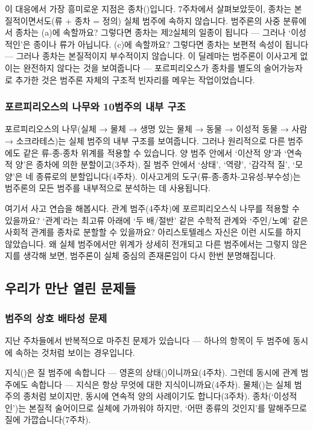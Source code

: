 \documentclass[12pt, a4paper]{article}
\begin{document}
이 대응에서 가장 흥미로운 지점은 종차()입니다. 7주차에서 살펴보았듯이, 종차는 본질적이면서도(류 + 종차 = 정의) 실체 범주에 속하지 않습니다. 범주론의 사중 분류에서 종차는 (a)에 속할까요? 그렇다면 종차는 제2실체의 일종이 됩니다 --- 그러나 `이성적인'은 종이나 류가 아닙니다. (c)에 속할까요? 그렇다면 종차는 보편적 속성이 됩니다 --- 그러나 종차는 본질적이지 부수적이지 않습니다. 이 딜레마는 범주론이 이사고게 없이는 완전하지 않다는 것을 보여줍니다 --- 포르피리오스가 종차를 별도의 술어가능자로 추가한 것은 범주론 자체의 구조적 빈자리를 메우는 작업이었습니다.

\subsubsection{포르피리오스의 나무와 10범주의 내부 구조}

포르피리오스의 나무(실체 → 물체 → 생명 있는 물체 → 동물 → 이성적 동물 → 사람 → 소크라테스)는 실체 범주의 내부 구조를 보여줍니다. 그러나 원리적으로 다른 범주에도 같은 류-종-종차 위계를 적용할 수 있습니다. 양 범주 안에서 `이산적 양'과 `연속적 양'은 종차에 의한 분할이고(3주차), 질 범주 안에서 `상태', `역량', `감각적 질', `모양'은 네 종류로의 분할입니다(4주차). 이사고게의 도구(류-종-종차-고유성-부수성)는 범주론의 모든 범주를 내부적으로 분석하는 데 사용됩니다.

여기서 사고 연습을 해봅시다. 관계 범주(4주차)에 포르피리오스식 나무를 적용할 수 있을까요? `관계'라는 최고류 아래에 `두 배/절반' 같은 수학적 관계와 `주인/노예' 같은 사회적 관계를 종차로 분할할 수 있을까요? 아리스토텔레스 자신은 이런 시도를 하지 않았습니다. 왜 실체 범주에서만 위계가 상세히 전개되고 다른 범주에서는 그렇지 않은지를 생각해 보면, 범주론이 실체 중심의 존재론임이 다시 한번 분명해집니다.

\subsection{우리가 만난 열린 문제들}

\subsubsection{범주의 상호 배타성 문제}

지난 주차들에서 반복적으로 마주친 문제가 있습니다 --- 하나의 항목이 두 범주에 동시에 속하는 것처럼 보이는 경우입니다.

지식()은 질 범주에 속합니다 --- 영혼의 상태()이니까요(4주차). 그런데 동시에 관계 범주에도 속합니다 --- 지식은 항상 무엇에 대한 지식이니까요(4주차). 물체()는 실체 범주의 종처럼 보이지만, 동시에 연속적 양의 사례이기도 합니다(3주차). 종차(`이성적인')는 본질적 술어이므로 실체에 가까워야 하지만, `어떤 종류의 것인지'를 말해주므로 질에 가깝습니다(7주차).
\end{document}
